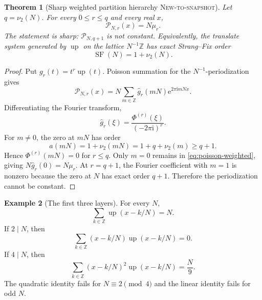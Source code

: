 \documentclass[11pt,oneside]{article}
\numberwithin{equation}{section}
\newtheorem{theorem}{Theorem}[section]
\theoremstyle{definition}
\newtheorem{example}[theorem]{Example}
\theoremstyle{remark}
\newcommand{\Z}{\mathbb Z}
\newcommand{\ii}{\mathrm i}
\newcommand{\e}{\mathrm e}
\newcommand{\Up}{\operatorname{up}}
\newcommand{\NewResult}{\textsc{New-to-snapshot}}
\begin{document}
\begin{theorem}[Sharp weighted partition hierarchy \NewResult]
\label{thm:weighted}
Let $q=\nu_2(N)$.  For every $0\le r\le q$ and every real $x$,
\begin{equation}
 \boxed{\mathcal P_{N,r}(x)=N\mu_r.}                       \label{eq:weighted-constant}
\end{equation}
The statement is sharp: $\mathcal P_{N,q+1}$ is not constant.  Equivalently, the
translate system generated by $\Up$ on the lattice $N^{-1}\Z$ has exact
Strang--Fix order
\begin{equation}
 \operatorname{SF}(N)=1+\nu_2(N).                          \label{eq:SF-order}
\end{equation}
\end{theorem}

\begin{proof}
Put $g_r(t)=t^r\Up(t)$.  Poisson summation for the $N^{-1}$-periodization gives
\begin{equation}
 \mathcal P_{N,r}(x)=N\sum_{m\in\Z}
 \widehat g_r(mN)\e^{2\pi\ii mNx}.                        \label{eq:poisson-weighted}
\end{equation}
Differentiating the Fourier transform,
\begin{equation}
 \widehat g_r(\xi)=\frac{\Phi^{(r)}(\xi)}{(-2\pi\ii)^r}.  \label{eq:moment-fourier}
\end{equation}
For $m\ne0$, the zero at $mN$ has order
\[
 a(mN)=1+\nu_2(mN)=1+q+\nu_2(m)\ge q+1.
\]
Hence $\Phi^{(r)}(mN)=0$ for $r\le q$.  Only $m=0$ remains in
\eqref{eq:poisson-weighted}, giving $N\widehat g_r(0)=N\mu_r$.
At $r=q+1$, the Fourier coefficient with $m=1$ is nonzero because the zero at
$N$ has exact order $q+1$.  Therefore the periodization cannot be constant.
\end{proof}

\begin{example}[The first three layers]
For every $N$,
\begin{equation}
 \sum_{k\in\Z}\Up(x-k/N)=N.                               \label{eq:PU}
\end{equation}
If $2\mid N$, then
\begin{equation}
 \sum_{k\in\Z}(x-k/N)\Up(x-k/N)=0.                        \label{eq:first-weight}
\end{equation}
If $4\mid N$, then
\begin{equation}
 \sum_{k\in\Z}(x-k/N)^2\Up(x-k/N)=\frac{N}{9}.           \label{eq:second-weight}
\end{equation}
The quadratic identity fails for $N\equiv2\pmod4$ and the linear identity fails
for odd $N$.
\end{example}
\end{document}
